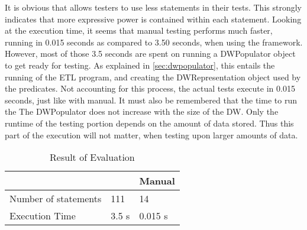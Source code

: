 It is obvious that \FW{} allows testers to use less statements in their tests. This strongly indicates that more expressive power is contained within each statement. Looking at the execution time, it seems that manual testing performs much faster, running in 0.015 seconds as compared to 3.50 seconds, when using the framework. However, most of those 3.5 seconds are spent on running a DWPopulator object to get ready for testing. As explained in \cref{sec:dwpopulator}, this entails the running of the ETL program, and creating the DWRepresentation object used by the predicates. Not accounting for this process, the actual tests execute in 0.015 seconds, just like with manual. It must also be remembered that the time to run the The DWPopulator does not increase with the size of the DW. Only the runtime of the  testing portion depends on the amount of data stored. Thus this part of the execution will not matter, when testing upon larger amounts of data.


\begin{table}[h]
\centering
\caption{Result of Evaluation}
\label{table:result}
\begin{tabular}{|p{}|p{}|p{}|}
\hline
												& \FW{}	 	& Manual				 \\ \hline

Number of statements  & 111 & 14 \\ \hline
Execution Time	& 3.5 s   & 0.015 s   \\ \hline
\end{tabular}
\end{table}







